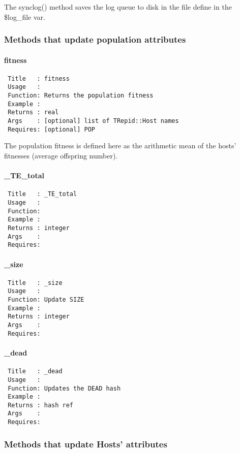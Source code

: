The synclog() method saves the log queue to disk in the file define in
the \$log\_file var.

\subsubsection*{Methods that update population attributes\label{Methods_that_update_population_attributes}}
\paragraph*{fitness\label{fitness}}
\begin{verbatim}
 Title   : fitness
 Usage   :
 Function: Returns the population fitness
 Example :
 Returns : real
 Args    : [optional] list of TRepid::Host names
 Requires: [optional] POP
\end{verbatim}


The population fitness is defined here as the arithmetic mean of the
hosts' fitnesses (average offspring number).

\paragraph*{\_TE\_total\label{_TE_total}}
\begin{verbatim}
 Title   : _TE_total
 Usage   : 
 Function: 
 Example : 
 Returns : integer
 Args    : 
 Requires:
\end{verbatim}
\paragraph*{\_size\label{_size}}
\begin{verbatim}
 Title   : _size
 Usage   : 
 Function: Update SIZE
 Example : 
 Returns : integer
 Args    : 
 Requires:
\end{verbatim}
\paragraph*{\_dead\label{_dead}}
\begin{verbatim}
 Title   : _dead
 Usage   : 
 Function: Updates the DEAD hash
 Example : 
 Returns : hash ref
 Args    : 
 Requires:
\end{verbatim}
\subsubsection*{Methods that update Hosts' attributes\label{Methods_that_update_Hosts_attributes}}
